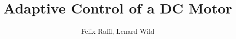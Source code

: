 \documentclass[11pt,a4paper]{article}
\begin{document}
\title{Adaptive Control of a DC Motor}
\author{Felix Raffl, Lenard Wild}
\date{}
\maketitle








\nocite{*}


\end{document}
